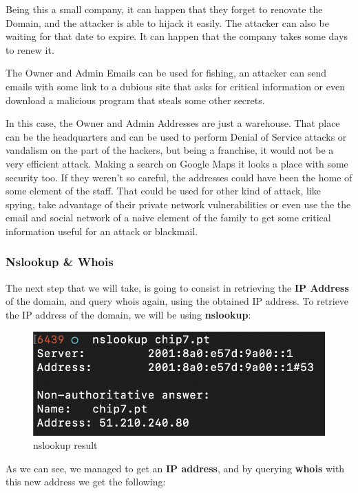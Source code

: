 Being this a small company, it can happen that they forget to renovate the Domain, and the attacker is able to hijack it easily. The attacker can also be waiting for that date to expire. It can happen that the company takes some days to renew it. 

The Owner and Admin Emails can be used for fishing, an attacker can send emails with some link to a dubious site that asks for critical information or even download a malicious program that steals some other secrets.

In this case, the Owner and Admin Addresses are just a warehouse. That place can be the headquarters and can be used to perform Denial of Service attacks or vandalism on the part of the hackers, but being a franchise, it would not be a very efficient attack. Making a search on Google Maps it looks a place with some security too. If they weren't so careful, the addresses could have been the home of some element of the staff. That could be used for other kind of attack, like spying, take advantage of their private network vulnerabilities or even use the the email and social network of a naive element of the family to get some critical information useful for an attack or blackmail.


\subsubsection{Nslookup \& Whois}

The next step that we will take, is going to consist in retrieving the \textbf{IP Address} of the domain, and query whois again, using the obtained IP address. To retrieve the IP address of the domain, we will be using \textbf{nslookup}:

\begin{figure}[ht!]
 	\centering
 	\includegraphics[width=.7\linewidth]{img/nsl1.png}
 	\caption{nslookup result}
\end{figure}

As we can see, we managed to get an \textbf{IP address}, and by querying \textbf{whois} with this new address we get the following:

